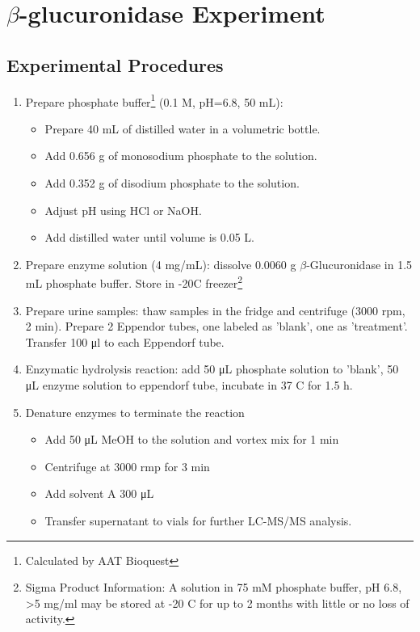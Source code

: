 \section{$\beta$-glucuronidase Experiment}
\subsection{Experimental Procedures}
\begin{enumerate}
	\item Prepare phosphate buffer\footnote{Calculated by AAT Bioquest} (0.1 M, pH=6.8, 50 mL): 
	\begin{itemize}
		\item Prepare 40 mL of distilled water in a volumetric bottle.
		\item Add 0.656 g of monosodium phosphate to the solution.
		\item Add 0.352 g of disodium phosphate to the solution.
		\item Adjust pH using HCl or NaOH.
		\item Add distilled water until volume is 0.05 L.
	\end{itemize}
	
	\item Prepare enzyme solution (4 mg/mL): dissolve 0.0060 g $\beta$-Glucuronidase in 1.5 mL phosphate buffer. Store in -20\degree C freezer\footnote{Sigma Product Information: A solution in 75 mM phosphate buffer, pH 6.8, \textgreater 5 mg/ml may be stored at -20 \degree C for up to 2 months with little or no loss of activity.}
	\item Prepare urine samples: thaw samples in the fridge and centrifuge (3000 rpm, 2 min). Prepare 2 Eppendor tubes, one labeled as 'blank', one as 'treatment'. Transfer 100 \si{\micro\litre} to each Eppendorf tube.
	\item Enzymatic hydrolysis reaction: add 50 \si{\micro\liter} phosphate solution to 'blank', 50 \si{\micro\liter} enzyme solution to eppendorf tube, incubate in 37 \degree C for 1.5 h.
	\item Denature enzymes to terminate the reaction
	\begin{itemize}
		\item Add 50 \si{\micro\liter} MeOH to the solution and vortex mix for 1 min
		\item Centrifuge at 3000 rmp for 3 min
		\item Add solvent A 300 \si{\micro\liter}
		\item Transfer supernatant to vials for further LC-MS/MS analysis.
	\end{itemize}
\end{enumerate}

